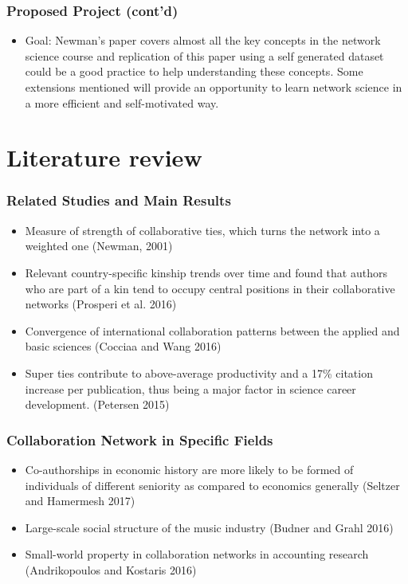 \documentclass{beamer}
\begin{document}
\begin{frame}\frametitle{Proposed Project (cont'd)}
\begin{itemize}
\item Goal: Newman's paper covers almost all the key concepts in the network science course and replication of this paper using a self generated dataset could be a good practice to help understanding these concepts. Some extensions mentioned will provide an opportunity to  learn network science in a more efficient and self-motivated way.
\end{itemize}
\end{frame}


\section{Literature review}

\begin{frame}
\end{frame}


\begin{frame}\frametitle{Related Studies and Main Results}
\begin{itemize}
\item Measure of strength of collaborative ties, which turns the network into a weighted one (Newman, 2001)
\item Relevant country-specific kinship trends over time and found that authors who are part of a kin tend to occupy central positions in their collaborative networks (Prosperi et al. 2016)
\item Convergence of international collaboration patterns between the applied and basic sciences (Cocciaa and Wang 2016) 
\item Super ties contribute to above-average productivity and a 17\% citation increase per publication, thus being a major factor in science career development. (Petersen 2015)
\end{itemize}
\end{frame}

\begin{frame}\frametitle{Collaboration Network in Specific Fields}
	\begin{itemize}
		\item Co-authorships in economic history are more likely to be formed of individuals of different seniority as compared to economics generally (Seltzer and Hamermesh 2017)
		\item Large-scale social structure of the music industry (Budner and Grahl 2016)
		\item Small-world property in collaboration networks in accounting research (Andrikopoulos and Kostaris 2016) 
	\end{itemize}
\end{frame}
\end{document}
